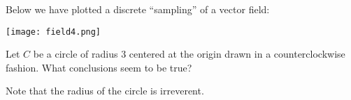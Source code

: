 \documentclass{ximera}
\begin{document}
\begin{exercise}
  Below we have plotted a discrete ``sampling'' of a vector field:
  \begin{image}
    \texttt{[image: field4.png]}
  \end{image}
  Let $C$ be a circle of radius $3$ centered at the origin drawn in a
  counterclockwise fashion.  What conclusions seem to be true?
  \begin{selectAll}
  \end{selectAll}
  \begin{hint}
    Note that the radius of the circle is irreverent. 
  \end{hint}
\end{exercise}
\end{document}
